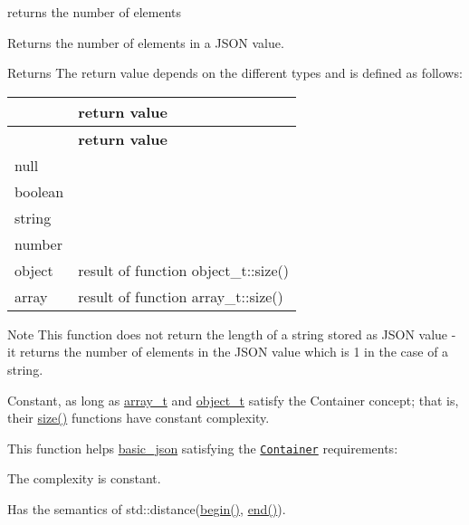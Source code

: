 returns the number of elements 

Returns the number of elements in a J\+S\+ON value.

\begin{DoxyReturn}{Returns}
The return value depends on the different types and is defined as follows\+: \tabulinesep=1mm
\begin{longtabu} spread 0pt [c]{*{2}{|X[-1]}|}
\hline
{}&{\bf return value  }\\
\endfirsthead
\hline
\endfoot
\hline
{}&{\bf return value  }\\
\endhead
null &{} \\
boolean &{} \\
string &{} \\
number &{} \\
object &result of function object\+\_\+t\+::size() \\
array &result of function array\+\_\+t\+::size() \\
\end{longtabu}

\end{DoxyReturn}
\begin{DoxyNote}{Note}
This function does not return the length of a string stored as J\+S\+ON value -\/ it returns the number of elements in the J\+S\+ON value which is 1 in the case of a string.
\end{DoxyNote}
Constant, as long as \hyperlink{classnlohmann_1_1basic__json_ab00b882d39306d663c23dab110f5cae0}{array\+\_\+t} and \hyperlink{classnlohmann_1_1basic__json_a0ac9894c9de8dc551cf2e5f1c605537f}{object\+\_\+t} satisfy the Container concept; that is, their \hyperlink{classnlohmann_1_1basic__json_a0ea8a1ecca4b3cb0ba09ad7552c364b6}{size()} functions have constant complexity.

This function helps {\ttfamily \hyperlink{classnlohmann_1_1basic__json}{basic\+\_\+json}} satisfying the \href{http://en.cppreference.com/w/cpp/concept/Container}{\tt Container} requirements\+:
\begin{DoxyItemize}
\item The complexity is constant.
\item Has the semantics of {\ttfamily std\+::distance(\hyperlink{classnlohmann_1_1basic__json_ad4e381c54039607be08d7af41a1f6ad1}{begin()}, \hyperlink{classnlohmann_1_1basic__json_a12ccf14d39ddae52f6c7e126105a230b}{end()})}.
\end{DoxyItemize}

